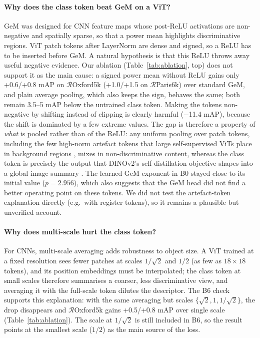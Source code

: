 \documentclass[runningheads]{llncs}
\newcommand{\roxf}{$\mathcal{R}$Oxford5k}
\newcommand{\rpar}{$\mathcal{R}$Paris6k}
\begin{document}
\paragraph{Why does the class token beat GeM on a ViT?}
GeM was designed for CNN feature maps whose post-ReLU activations are
non-negative and spatially sparse, so that a power mean highlights
discriminative regions. ViT patch tokens after LayerNorm are dense and signed,
so a ReLU has to be inserted before GeM. A natural hypothesis is that this ReLU
throws away useful negative evidence. Our ablation (Table~\ref{tab:ablation},
top) does not support it as the main cause: a signed power mean without ReLU
gains only +0.6/+0.8 mAP on \roxf{} (+1.0/+1.5 on \rpar{}) over standard GeM,
and plain average pooling, which also keeps the sign, behaves the same; both
remain 3.5--5 mAP below the untrained class token. Making the tokens
non-negative by shifting instead of clipping is clearly harmful
($-$11.4 mAP), because the shift is dominated by a few extreme values. The gap
is therefore a property of \emph{what} is pooled rather than of the ReLU: any
uniform pooling over patch tokens, including the few high-norm artefact tokens
that large self-supervised ViTs place in background regions
\cite{darcet2024registers}, mixes in non-discriminative content, whereas the
class token is precisely the output that DINOv2's self-distillation objective
shapes into a global image summary \cite{caron2021dino,oquab2024dinov2}. The
learned GeM exponent in B0 stayed close to its initial value ($p=2.956$),
which also suggests that the GeM head did not find a better operating point on
these tokens. We did not test the artefact-token explanation directly (e.g.\
with register tokens), so it remains a plausible but unverified account.

\paragraph{Why does multi-scale hurt the class token?}
For CNNs, multi-scale averaging adds robustness to object size. A ViT trained
at a fixed resolution sees fewer patches at scales $1/\sqrt2$ and $1/2$ (as
few as $18\times18$ tokens), and its position embeddings must be interpolated;
the class token at small scales therefore summarises a coarser, less
discriminative view, and averaging it with the full-scale token dilutes the
descriptor. The B6 check supports this explanation: with the same averaging
but scales $\{\sqrt2,1,1/\sqrt2\}$, the drop disappears and \roxf{} gains
+0.5/+0.8 mAP over single scale (Table~\ref{tab:ablation}). The scale at
$1/\sqrt2$ is still included in B6, so the result points at the smallest scale
($1/2$) as the main source of the loss.
\end{document}
